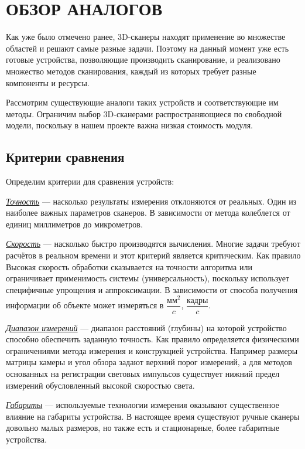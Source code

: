 \chapter{ОБЗОР АНАЛОГОВ}
    Как уже было отмечено ранее, 3D-сканеры находят применение во множестве областей и решают самые разные задачи. Поэтому на данный момент уже есть готовые устройства, позволяющие производить сканирование, и реализовано множество методов сканирования, каждый из которых требует разные компоненты и ресурсы. 
    
    Рассмотрим существующие аналоги таких устройств и соответствующие им методы. Ограничим выбор 3D-сканерами распространяющиеся по свободной модели, поскольку в нашем проекте важна низкая стоимость модуля.
    
    \section{Критерии сравнения}
        Определим критерии для сравнения устройств:
    
        
        \underline{\textit{Точность}} --- насколько результаты измерения отклоняются от реальных. Один из наиболее важных параметров сканеров. В зависимости от метода колеблется от единиц миллиметров до микрометров.
        
        \underline{\textit{Скорость}} --- насколько быстро производятся вычисления. Многие задачи требуют расчётов в реальном времени и этот критерий является критическим. Как правило Высокая скорость обработки сказывается на точности алгоритма или ограничивает применимость системы (универсальность), поскольку использует специфичные упрощения и аппроксимации. В зависимости от способа получения информации об объекте может измеряться в $ \dfrac{\text{мм}^2}{c} $, $ \dfrac{\text{кадры}}{c} $.
        
        \underline{\textit{Диапазон измерений}} --- диапазон расстояний (глубины) на которой  устройство способно обеспечить заданную точность. Как правило определяется физическими ограничениями метода измерения и конструкцией устройства. Например размеры матрицы камеры и угол обзора задают верхний порог измерений, а для методов основанных на регистрации световых импульсов существует нижний предел измерений обусловленный высокой скоростью света.
        
        \underline{\textit{Габариты}} --- используемые технологии измерения оказывают существенное влияние на габариты устройства. В настоящее время существуют ручные сканеры довольно малых размеров, но также есть и стационарные, более габаритные устройства.

